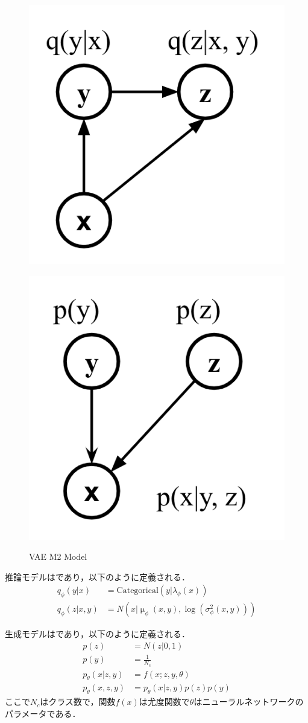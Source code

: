 \begin{figure}[H]
	\centering
	\begin{minipage}{0.4\columnwidth}
		\centering
		\includegraphics[clip, width=0.7\linewidth]{fig/chapter2/discriminative_vae}
		\label{fig:m2_discriminative}
	\end{minipage}
	\begin{minipage}{0.4\columnwidth}
		\centering
		\includegraphics[clip, width=0.7\linewidth]{fig/chapter2/generative_vae}
		\label{fig:m2_generative}
	\end{minipage}
	\caption{VAE M2 Model}
	\label{fig:vae_m2}
\end{figure}

推論モデルはであり，以下のように定義される．
\begin{align}\label{eq:m2_discriminative}
q_\phi (y | x) & = \mathrm{Categorical}(y | \lambda_\phi (x)) \\
q_\phi (z | x, y) & = N(x | \upmu_\phi(x, y), \log(\sigma_\phi^2 (x, y)))
\end{align}

生成モデルはであり，以下のように定義される．
\begin{align}\label{eq:m2_generative}
p(z) & = N (z| 0, 1)  \\
p(y) & = \frac{1}{N_c} \\
p_\theta (x|z, y) & = f(x; z, y, \theta) \\
p_\theta (x, z, y) & = p_\theta (x|z, y) p(z) p(y)
\end{align}
ここで$N_c$はクラス数で，関数$f(x)$は尤度関数で$\theta$はニューラルネットワークのパラメータである．